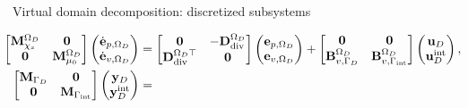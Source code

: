 \documentclass[aspectratio=169]{ISAE-Beamer}
\DeclareMathOperator*{\grad}{grad}
\renewcommand{\div}{\operatorname{div}}
\begin{document}
\begin{frame}{Virtual domain decomposition: discretized subsystems}

\begin{tcolorbox}[colframe=blue,title=Subdomain $\Omega_D$ (I.B.P. $\grad$),  coltitle=white]%
	\setlength{\abovedisplayskip}{1pt}
	\setlength{\belowdisplayskip}{1pt}
	\begin{equation*}
	\hspace*{-0.3cm}
	\begin{aligned}
	\begin{bmatrix}
	\mathbf{M}_{\chi_s}^{\Omega_D} & \mathbf{0} \\
	\mathbf{0} & \mathbf{M}_{\mu_0}^{\Omega_D} \\
	\end{bmatrix}
	\begin{pmatrix}
	\dot{\mathbf{e}}_{p, \Omega_D} \\
	\dot{\mathbf{e}}_{v, \Omega_D} \\
	\end{pmatrix}
	&= \begin{bmatrix}
	\mathbf{0} & -\mathbf{D}_{\div}^{\Omega_D}\\
	\mathbf{D}_{\div}^{\Omega_D \top} & \mathbf{0}\\
	\end{bmatrix}
	\begin{pmatrix}
	{\mathbf{e}}_{p, \Omega_D}\\
	{\mathbf{e}}_{v, \Omega_D}\\
	\end{pmatrix} + \begin{bmatrix}
	\mathbf{0} & \mathbf{0}\\
	\mathbf{B}_{v, \Gamma_{D}}^{\Omega_D} & \mathbf{B}_{v, \Gamma_{\text{int}}}^{\Omega_D}\\
	\end{bmatrix}
	\begin{pmatrix}
	\mathbf{u}_D \\
	\mathbf{u}_D^{\text{int}}
	\end{pmatrix}, \\
	\begin{bmatrix}
	\mathbf{M}_{\Gamma_D} & \mathbf{0} \\
	\mathbf{0} & \mathbf{M}_{\Gamma_{\text{int}}} \\
	\end{bmatrix}
	\begin{pmatrix}
	\mathbf{y}_D \\
	\mathbf{y}_D^{\text{int}}
	\end{pmatrix} &=

\end{aligned}
\end{equation*}
\end{tcolorbox}
\end{frame}
\end{document}
